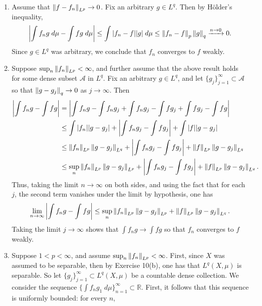 \documentclass{article}
\begin{document}
\begin{enumerate}[itemsep =-2pt,label = (\alph{*})]
	\item Assume that $\left\Vert f - f_{n} \right\Vert_{L^p} \to 0$. Fix an arbitrary $g \in L^q$. Then by H\"older's inequality, 
	\begin{equation*}
		\left| \int f_{n}g\;d\mu - \int fg\;d\mu \right| \leq \int |f_{n} - f||g|\;d\mu \leq \left\Vert f_{n} - f \right\Vert_{p}\left\Vert g \right\Vert_{q} \xrightarrow{n \to 0} 0. 
	\end{equation*}
	Since $g \in L^q$ was arbitrary, we conclude that $f_{n}$ converges to $f$ weakly. 
	
	\item Suppose $\sup_{n}\left\Vert f_{n} \right\Vert_{L^p} < \infty$, and further assume that the above result holds for some dense subset $\mathcal{A}$ in $L^{q}$. Fix an arbitrary $g \in L^q$, and let $\{g_{j}\}_{j = 1}^{\infty} \subset \mathcal{A}$ so that $\left\Vert g - g_{j} \right\Vert_{q} \to 0$ as $j \to \infty$. Then 
	\begin{align*}
		\begin{split}
			\left| \int f_{n}g - \int fg \right| &= \left| \int f_{n}g - \int f_{n}g_{j} + \int f_{n}g_{j} - \int fg_{j} + \int fg_{j} - \int fg \right| \\
			&\leq \int |f_{n}||g - g_{j}| + \left| \int f_{n}g_{j} - \int fg_{j} \right| + \int |f||g - g_{j}|\\
			&\leq \left\Vert f_{n} \right\Vert_{L^p}\left\Vert g - g_{j} \right\Vert_{L^q} + \left| \int f_{n}g_{j} - \int fg_{j} \right| + \left\Vert f \right\Vert_{L^p}\left\Vert g - g_{j} \right\Vert_{L^q} \\
			&\leq \sup_{n}\left\Vert f_{n} \right\Vert_{L^p} \left\Vert g - g_{j} \right\Vert_{L^p} + \left| \int f_{n}g_{j} - \int fg_{j} \right| + \left\Vert f \right\Vert_{L^p}\left\Vert g - g_{j} \right\Vert_{L^q}. 
		\end{split}
	\end{align*}
	Thus, taking the limit $n \to \infty$ on both sides, and using the fact that for each $j$, the second term vanishes under the limit by hypothesis, one has 
	\begin{equation*}
		\lim_{n \to \infty}\left| \int f_{n}g -\int fg \right| \leq \sup_{n}\left\Vert f_{n} \right\Vert_{L^p}\left\Vert g - g_{j} \right\Vert_{L^p} + \left\Vert f \right\Vert_{L^p}\left\Vert g - g_{j} \right\Vert_{L^q}. 
	\end{equation*}
	Taking the limit $j \to \infty$ shows that $\int f_{n}g \to \int fg$ so that $f_{n}$ converges to $f$ weakly. 
	\item Suppose $1 < p < \infty$, and assume $\sup_{n}\left\Vert f_{n} \right\Vert_{L^p} < \infty$. First, since $X$ was assumed to be separable, then by Exercise 10(b), one has that $L^q(X,\mu)$ is separable. So let $\{g_{j}\}_{j = 1}^{\infty} \subset L^{q}(X,\mu)$ be a countable dense collection. We consider the sequence $\{\int f_{n}g_{1}\;d\mu\}_{n = 1}^{\infty} \subset \mathbb{R}$. First, it follows that this sequence is uniformly bounded: for every $n$, 

\end{enumerate}
\end{document}
